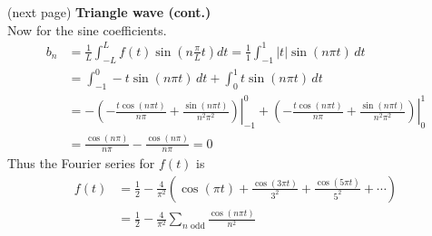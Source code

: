 \documentclass{report}
\begin{document}
(next page)
\newpage
\noindent\textbf{Triangle wave (cont.)}\\
Now for the sine coefficients.
\begin{align*}
b_n&=\frac{1}{L}\int^L_{-L}f(t)\sin\left(n\frac{\pi}{L}t\right)dt=\frac{1}{1}\int^1_{-1}|t|\sin(n\pi t)\,dt\\
&=\int^0_{-1}-t\sin(n\pi t)\,dt+\int^1_{0}t\sin(n\pi t)\,dt\\
&=-\left(\left.-\frac{t\cos(n\pi t)}{n\pi}+\frac{\sin(n\pi t)}{n^2\pi^2}\right)\right|^0_{-1}+
\left(\left.-\frac{t\cos(n\pi t)}{n\pi}+\frac{\sin(n\pi t)}{n^2\pi^2}\right)\right|^1_{0}\\
&=\frac{\cos(n\pi)}{n\pi}-\frac{\cos(n\pi)}{n\pi}=0
\end{align*}
Thus the Fourier series for $f(t)$ is 
\begin{align*}
f(t)&=\frac{1}{2}-\frac{4}{\pi^2}\left(\cos(\pi t)+\frac{\cos(3\pi t)}{3^2}+\frac{\cos(5\pi t)}{5^2}+\cdots\right)\\
&=\frac{1}{2}-\frac{4}{\pi^2}\sum_{n\text{ odd}}\frac{\cos(n\pi t)}{n^2}
\end{align*}
\newpage
\end{document}
